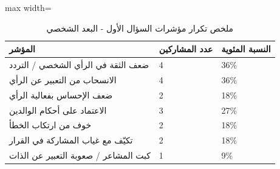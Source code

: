 \documentclass[12pt,oneside]{report}
\begin{document}
\begin{table}[H]
\centering
\caption{ملخص تكرار مؤشرات السؤال الأول - البعد الشخصي}
\small
\renewcommand{\arraystretch}{1.3}
\setlength{\tabcolsep}{4pt}
\begin{adjustbox}{max width=\textwidth}
\begin{tabular}{p{6cm} p{4cm} p{4cm}}
\toprule
\textbf{المؤشر} & \textbf{عدد المشاركين} & \textbf{النسبة المئوية} \\
\midrule
ضعف الثقة في الرأي الشخصي / التردد & 4 & 36\% \\
الانسحاب من التعبير عن الرأي & 4 & 36\% \\
ضعف الإحساس بفعالية الرأي & 2 & 18\% \\
الاعتماد على أحكام الوالدين & 3 & 27\% \\
خوف من ارتكاب الخطأ & 2 & 18\% \\
تكيّف مع غياب المشاركة في القرار & 2 & 18\% \\
كبت المشاعر / صعوبة التعبير عن الذات & 1 & 9\% \\
\bottomrule
\end{tabular}
\end{adjustbox}
\end{table}
\end{document}
